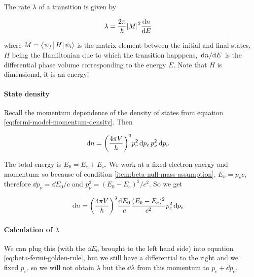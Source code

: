 \documentclass[main.tex]{subfiles}
\begin{document}
The rate \(\lambda\) of a transition is given by

\begin{equation} \label{eq:beta-fermi-golden-rule}
    \lambda = \frac{2 \pi}{\hbar} \abs{M}^2 \dv{n}{E}
\end{equation}

where \(M = \bra{\psi_f} H \ket{\psi_i}  \) is the matrix element between the initial and final states, \(H\) being the Hamiltonian due to which the transition happpens, \(\dv*{n}{E} \) is the differential phase volume corresponding to the energy \(E\).
Note that \(H\) is dimensional, it is an energy!


\paragraph{State density}

Recall the momentum dependence of the density of states from equation \eqref{eq:fermi-model-momentum-density}. Then

\begin{equation}
    \dd{n} = \qty(\frac{4 \pi V}{h})^3 p^2_e \dd{p_e} p^2_\nu \dd{p_\nu}
\end{equation}

The total energy is \(E_0 = E_e + E_\nu\). We work at a fixed electron energy and momentum: so because of condition \ref{item:beta-null-mass-assumption}, \(E_\nu = p_\nu c\), therefore \(\dd{p_\nu}  = \dd{E_0} /c\) and \(p_\nu^2 = (E_0 - E_e)^2/c^2\).
So we get

\begin{equation}
    \dd{n} = \qty(\frac{4 \pi V}{h})^3 \frac{\dd{E_0}}{c} \frac{(E_0 - E_e)^2}{c^2} p^2_e \dd{p_e}
\end{equation}

\paragraph{Calculation of \(\lambda\)}

We can plug this (with the \(\dd{E_0}\) brought to the left hand side) into equation \eqref{eq:beta-fermi-golden-rule}, but we still have a differential to the right and we fixed \(p_e\), so we will not obtain \(\lambda\) but the \(\dd{\lambda}\) from this momentum to \(p_e + \dd{p_e} \).
\end{document}
